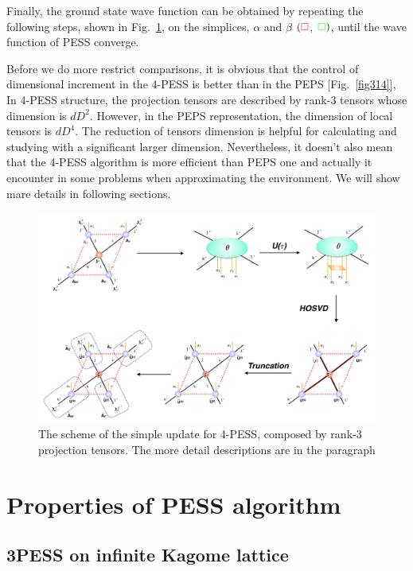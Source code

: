 Finally, the ground state wave function can be obtained by repeating the following steps, shown in Fig.~\ref{fig4326}, on the simplices, $\alpha$ and $\beta$ $( \color{red} \square$, ${\color{green} \square})$, until the wave function of PESS converge.

Before we do more restrict comparisons, it is obvious that the control of dimensional increment in the 4-PESS is better than in the PEPS [Fig.~\ref{fig314}], In 4-PESS structure, the projection tensors are described by rank-3 tensors whose dimension is $dD^2$. However, in the PEPS representation, the dimension of local tensors is $dD^4$. The reduction of tensors dimension is helpful for calculating and studying with a significant larger dimension. Nevertheless, it doesn't also mean that the 4-PESS algorithm is more efficient than PEPS one and actually it encounter in some problems when approximating the environment. We will show mare details in following sections.

\begin{figure}[ht]
	\centering
	\includegraphics[width=1.00\textwidth]{figures/fig4326.png}
	\caption[The scheme of the simple update for 4-PESS, composed by rank-3 projection tensors.]{The scheme of the simple update for 4-PESS, composed by rank-3 projection tensors. The more detail descriptions are in the paragraph}
	\label{fig4326}
\end{figure}

\section{Properties of PESS algorithm}
\label{ppess}

\subsection{3PESS on infinite Kagome lattice}

